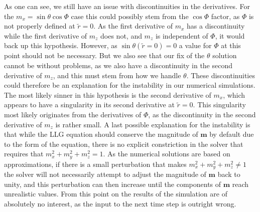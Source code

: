 As one can see, we still have an issue with discontinuities in the derivatives. For the $m_x = \sin\theta\cos\Phi$ case this could possibly stem from the $\cos\Phi$ factor, as $\Phi$ is not properly defined at $\tilde{r}=0$. As the first derivative of $m_x$ has a discontinuity while the first derivative of $m_z$ does not, and $m_z$ is independent of $\Phi$, it would back up this hypothesis. However, as $\sin\theta(\tilde{r}=0)=0$ a value for $\Phi$ at this point should not be necessary. But we also see that our fix of the $\theta$ solution cannot be without problems, as we also have a discontinuity in the second derivative of $m_z$, and this must stem from how we handle $\theta$. These discontinuities could therefore be an explanation for the instability in our numerical simulations. The most likely sinner in this hypothesis is the second derivative of $m_x$, which appears to have a singularity in its second derivative at $\tilde{r}=0$. This singularity most likely originates from the derivatives of $\Phi$, as the discontinuity in the second derivative of $m_z$ is rather small. A last possible explanation for the instability is that while the LLG equation should conserve the magnitude of $\mathbold{m}$ by default due to the form of the equation, there is no explicit constriction in the solver that requires that $m_x^2+m_y^2+m_z^2=1$. As the numerical solutions are based on approximations, if there is a small perturbation that makes $m_x^2+m_y^2+m_z^2\neq1$ the solver will not necessarily attempt to adjust the magnitude of $\mathbold{m}$ back to unity, and this perturbation can then increase until the components of $\mathbold{m}$ reach unrealistic values. From this point on the results of the simulation are of absolutely no interest, as the input to the next time step is outright wrong.

